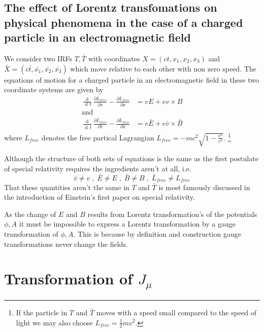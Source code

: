 \documentclass{article}
\DeclareMathOperator{\dd}{d\!}
\begin{document}
\subsection{The effect of Lorentz transfomations on physical phenomena in the case of a charged particle in an electromagnetic field}

We consider two IRFs $T, \bar{T}$ with coordinates $X=(ct, x_1, x_2, x_3)$ and $\bar{X}=(c \bar{t}, \bar{x_1}, \bar{x_2}, \bar{x_3})$ which move relative to each other with non zero speed.
The equations of motion for a charged particle in an electromagnetic field in these two coordinate systems are given by
\begin{align}
  \frac{\dd}{\dd t} \frac{\partial L_{free}}{\partial v} - \frac{\partial L_{free}}{\partial x} &= e E + e v \times B \\
  \text{and} \nonumber \\
  \frac{\dd}{\dd \bar{t}} \frac{\partial \bar{L}_{free}}{\partial \bar{v}} - \frac{\partial \bar{L}_{free}}{\partial \bar{x}} &= e \bar{E} + e \bar{v} \times \bar{B}
\end{align}
where $L_{free}$ denotes the free partical Lagrangian $L_{free} = - m c^2 \sqrt{1 - \frac{v^2}{c^2}}$.
\footnote{If the particle in $T$ and $\bar{T}$ moves with a speed small compared to the speed of light we may also choose $L_{free} = \frac{1}{2} m v^2$.}

Although the structure of both sets of equations is the same as the first postulate of special relativity requires the ingredients aren't at all, i.e.
\begin{equation}
  \bar{v} \neq v \;,\; \bar{E} \neq E \;,\; \bar{B} \neq B \;,\; \bar{L}_{free} \neq L_{free}
\end{equation}
That these quantities aren't the same in $T$ and $\bar{T}$ is most famously discussed in the introduction of Einstein's first paper on special relativity\cite{EinsteinSpecialRelativity}.

As the change of $E$ and $B$ results from Lorentz transformation's of the potentials $\phi, A$ it must be impossible to express a Lorentz transformation by a gauge transformation of $\phi, A$.
This is because by definition and construction gauge transformations never change the fields.



\appendix

\section{Transformation of $J_\mu$} \label{appendixConinuity}
\end{document}
